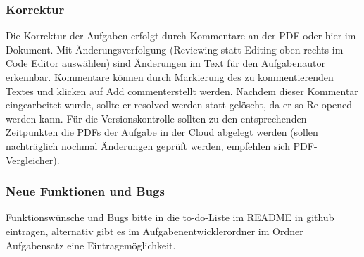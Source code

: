 \documentclass[./main.tex]{subfiles}
\begin{document}
\subsubsection{Korrektur}
Die Korrektur der Aufgaben erfolgt durch Kommentare an der PDF oder hier im Dokument. Mit \"Anderungsverfolgung (Reviewing statt Editing oben rechts im Code Editor auswählen) sind \"Anderungen im Text f\"ur den Aufgabenautor erkennbar. Kommentare können durch Markierung des zu kommentierenden Textes und klicken auf \glqq Add comment\grqq  erstellt werden. Nachdem dieser Kommentar eingearbeitet wurde, sollte er resolved werden statt gelöscht, da er so Re-opened werden kann. 
F\"ur die Versionskontrolle sollten zu den entsprechenden Zeitpunkten die PDFs der Aufgabe in der Cloud abgelegt werden (sollen nachtr\"aglich nochmal \"Anderungen gepr\"uft werden, empfehlen sich PDF-Vergleicher). 

\subsubsection{Neue Funktionen und Bugs}
Funktionsw\"unsche und Bugs bitte in die to-do-Liste im README in github eintragen, alternativ gibt es im Aufgabenentwicklerordner im Ordner Aufgabensatz eine Eintragem\"oglichkeit. 
\newpage
\end{document}
